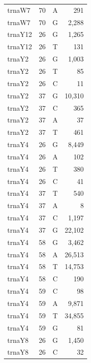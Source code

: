 \documentclass[12pt]{rockefeller}
\begin{document}
{\begin{center}
\begin{supertabular}{|l|r|c|r|}
  trnaW7 &        70 &          A &        291 \\
  trnaW7 &        70 &          G &      2,288 \\
 trnaY12 &        26 &          G &      1,265 \\
 trnaY12 &        26 &          T &        131 \\
  trnaY2 &        26 &          G &      1,003 \\
  trnaY2 &        26 &          T &         85 \\
  trnaY2 &        26 &          C &         11 \\
  trnaY2 &        37 &          G &     10,310 \\
  trnaY2 &        37 &          C &        365 \\
  trnaY2 &        37 &          A &         37 \\
  trnaY2 &        37 &          T &        461 \\
  trnaY4 &        26 &          G &      8,449 \\
  trnaY4 &        26 &          A &        102 \\
  trnaY4 &        26 &          T &        380 \\
  trnaY4 &        26 &          C &         41 \\
  trnaY4 &        37 &          T &        540 \\
  trnaY4 &        37 &          A &          8 \\
  trnaY4 &        37 &          C &      1,197 \\
  trnaY4 &        37 &          G &     22,102 \\
  trnaY4 &        58 &          G &      3,462 \\
  trnaY4 &        58 &          A &     26,513 \\
  trnaY4 &        58 &          T &     14,753 \\
  trnaY4 &        58 &          C &        190 \\
  trnaY4 &        59 &          C &         98 \\
  trnaY4 &        59 &          A &      9,871 \\
  trnaY4 &        59 &          T &     34,855 \\
  trnaY4 &        59 &          G &         81 \\
  trnaY8 &        26 &          G &      1,450 \\
  trnaY8 &        26 &          C &         32 \\

\end{supertabular}
\end{center}}
\end{document}
